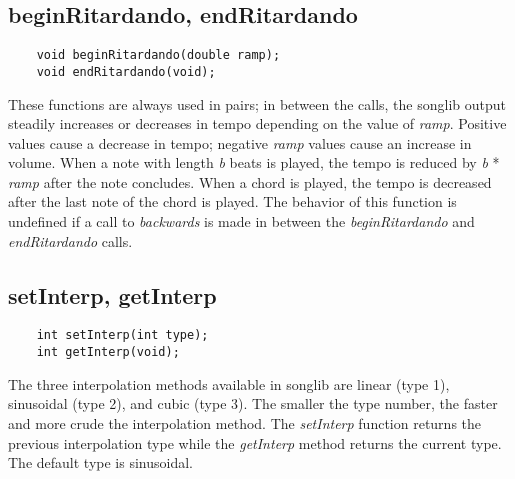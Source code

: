 \documentclass{article}
\begin{document}
\subsection*{beginRitardando, endRitardando}

\begin{verbatim}
    void beginRitardando(double ramp);
    void endRitardando(void);
\end{verbatim}

These functions are always used in pairs; in between the calls,
the songlib output steadily increases or decreases in tempo depending
on the value of {\it ramp}. Positive values cause a
decrease in tempo; negative {\it ramp} values cause
an increase in volume. When a note with length {\it b} beats is played,
the tempo is reduced by {\it b} * {\it ramp} after the note
concludes. When a chord is played, the tempo is decreased after the
last note of the chord is played.
The behavior of this function is undefined if a call to {\it backwards} is
made in between the {\it beginRitardando} and {\it endRitardando} calls.

\subsection*{setInterp, getInterp}

\begin{verbatim}
    int setInterp(int type);
    int getInterp(void);
\end{verbatim}

The three interpolation methods available in songlib
are linear (type 1), sinusoidal (type 2), and cubic (type 3).
The smaller the type number, the faster and more crude the
interpolation method. The {\it setInterp} function returns the previous
interpolation type while the {\it getInterp} method returns the
current type. The default type is sinusoidal.
\end{document}
